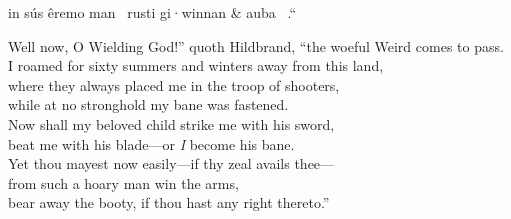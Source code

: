 in sús êremo man \hld\ rusti gi·winnan &
auba  \hld\ .“\eva

\bvb Well now, O Wielding God!” quoth Hildbrand, “the woeful Weird comes to pass. \\
I roamed for sixty summers and winters away from this land, \\
where they always placed me in the troop of shooters, \\
while at no stronghold my bane was fastened. \\
Now shall my beloved child strike me with his sword, \\
beat me with his blade---or \emph{I} become his bane. \\
Yet thou mayest now easily---if thy zeal avails thee--- \\
from such a hoary man win the arms, \\
bear away the booty, if thou hast any right thereto.”\evb\evg


